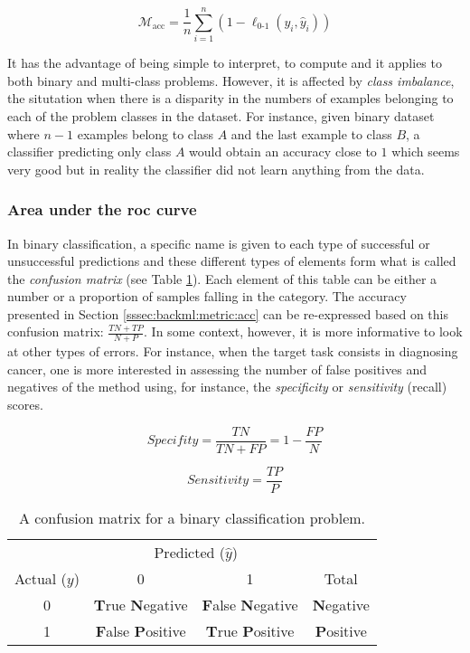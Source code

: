 \begin{equation}
\label{eqn:backml:accuracy}
\mathcal{M}_{\text{acc}} = \dfrac{1}{n} \sum\limits_{i = 1}^n (1 - \ell_{\text{0-1}}(y_i, \hat{y}_i))
\end{equation} 

It has the advantage of being simple to interpret, to compute and it applies to both binary and multi-class problems. However, it is affected by \textit{class imbalance}, the situtation when there is a disparity in the numbers of examples belonging to each of the problem classes in the dataset. For instance, given binary dataset where $n-1$ examples belong to class $A$ and the last example to class $B$, a classifier predicting only class $A$ would obtain an accuracy close to $1$ which seems very good but in reality the classifier did not learn anything from the data.      

\subsubsection{Area under the \acrlong{roc} curve}
\label{sssec:backml:metric:rocauc}

In binary classification, a specific name is given to each type of successful or unsuccessful predictions and these different types of elements form what is called the \textit{confusion matrix} (see Table \ref{tab:backml:confusion}). Each element of this table can be either a number or a proportion of samples falling in the category. The accuracy presented in Section \ref{sssec:backml:metric:acc} can be re-expressed based on this confusion matrix: $\frac{TN + TP}{N + P}$. In some context, however, it is more informative to look at other types of errors. For instance, when the target task consists in diagnosing cancer, one is more interested in assessing the number of false positives and negatives of the method using, for instance, the \textit{specificity} or \textit{sensitivity} (\aka recall) scores.

\begin{equation}
\label{eqn:backml:specifity}
\textit{Specifity} = \frac{TN}{TN + FP} = 1 - \frac{FP}{N}
\end{equation}

\begin{equation}
\label{eqn:backml:sensitivity}
\textit{Sensitivity} = \frac{TP}{P}
\end{equation}

\begin{table}
  \centering
  \begin{tabular}{c|cc|c}
  & \multicolumn{2}{c}{Predicted ($\hat{y}$)} & \\
  Actual ($y$) & 0 & 1 & Total \\
  \hline
  0 & \textbf{T}rue \textbf{N}egative & \textbf{F}alse \textbf{N}egative & \textbf{N}egative \\
  1 & \textbf{F}alse \textbf{P}ositive & \textbf{T}rue \textbf{P}ositive & \textbf{P}ositive \\
  \end{tabular}
  \caption{A confusion matrix for a binary classification problem.}
  \label{tab:backml:confusion}
\end{table}

